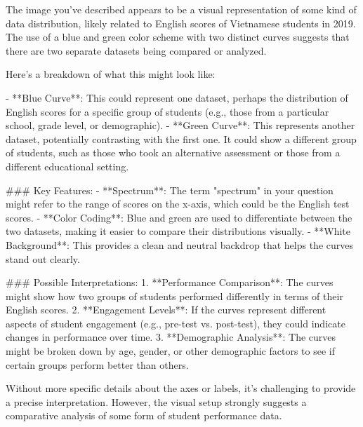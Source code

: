 The image you've described appears to be a visual representation of some kind of data distribution, likely related to English scores of Vietnamese students in 2019. The use of a blue and green color scheme with two distinct curves suggests that there are two separate datasets being compared or analyzed.

Here's a breakdown of what this might look like:

- **Blue Curve**: This could represent one dataset, perhaps the distribution of English scores for a specific group of students (e.g., those from a particular school, grade level, or demographic).
- **Green Curve**: This represents another dataset, potentially contrasting with the first one. It could show a different group of students, such as those who took an alternative assessment or those from a different educational setting.

### Key Features:
- **Spectrum**: The term "spectrum" in your question might refer to the range of scores on the x-axis, which could be the English test scores.
- **Color Coding**: Blue and green are used to differentiate between the two datasets, making it easier to compare their distributions visually.
- **White Background**: This provides a clean and neutral backdrop that helps the curves stand out clearly.

### Possible Interpretations:
1. **Performance Comparison**: The curves might show how two groups of students performed differently in terms of their English scores.
2. **Engagement Levels**: If the curves represent different aspects of student engagement (e.g., pre-test vs. post-test), they could indicate changes in performance over time.
3. **Demographic Analysis**: The curves might be broken down by age, gender, or other demographic factors to see if certain groups perform better than others.

Without more specific details about the axes or labels, it's challenging to provide a precise interpretation. However, the visual setup strongly suggests a comparative analysis of some form of student performance data.